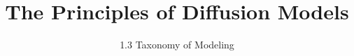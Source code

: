 ﻿%

\title{The Principles of Diffusion Models}
\subtitle{1.3 Taxonomy of Modeling}


\begin{frame}
    \titlepage
\end{frame}


